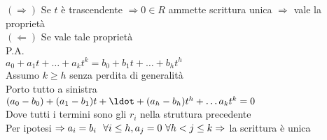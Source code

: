 \documentclass[12px]{article}
\begin{document}
	 \begin{dimo}
	 	$ (\Rightarrow )$ Se $t$ è trascendente $ \Rightarrow 0
		\in R$ ammette scrittura unica $ \Rightarrow $ vale la proprietà\\
		$ ( \Leftarrow)$ Se vale tale proprietà \\
		P.A.\\
		 $a_0 + a_1t + \ldots + a_kt^k = b_0 + b_1t + \ldots + b_ht^h$\\
		 Assumo $k\geq h$ senza perdita di generalità\\
		 Porto tutto a sinistra\\
		  $(a_0 - b_0) + (a_1 - b_1)t + \ldot + (a_h - b_h)t^h + \ldots a_kt^k = 0$\\
		  Dove tutti i termini sono gli  $r_i$ nella struttura precedente\\
		  Per ipotesi $ \Rightarrow a_i =b_i \ \ \forall i\leq h, a_j = 0\ \forall h < j \leq k\\
		   \Rightarrow $ la scrittura è unica 
	 \end{dimo}
	
\end{document}
